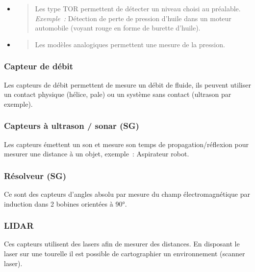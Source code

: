 \documentclass[
]{article}
\begin{document}
\begin{itemize}
\item
  \begin{quote}
  Les type TOR permettent de détecter un niveau choisi au préalable.
  \emph{Exemple~:} Détection de perte de pression d'huile dans un moteur
  automobile (voyant rouge en forme de burette d'huile).
  \end{quote}
\item
  \begin{quote}
  Les modèles analogiques permettent une mesure de la pression.
  \end{quote}
\end{itemize}

\hypertarget{capteur-de-duxe9bit}{%
\subsubsection{Capteur de débit}\label{capteur-de-duxe9bit}}

Les capteurs de débit permettent de mesure un débit de fluide, ils
peuvent utiliser un contact physique (hélice, pale) ou un système sans
contact (ultrason par exemple).

\hypertarget{capteurs-uxe0-ultrason-sonar-sg}{%
\subsubsection{Capteurs à ultrason / sonar
(SG)}\label{capteurs-uxe0-ultrason-sonar-sg}}

Les capteurs émettent un son et mesure son temps de
propagation/réflexion pour mesurer une distance à un objet, exemple~:
Aspirateur robot.

\hypertarget{ruxe9solveur-sg}{%
\subsubsection{Résolveur (SG)}\label{ruxe9solveur-sg}}

Ce sont des capteurs d'angles absolu par mesure du champ
électromagnétique par induction dans 2 bobines orientées à 90°.

\hypertarget{lidar}{%
\subsubsection{LIDAR}\label{lidar}}

Ces capteurs utilisent des lasers afin de mesurer des distances. En
disposant le laser sur une tourelle il est possible de cartographier un
environnement (scanner laser).
\end{document}
